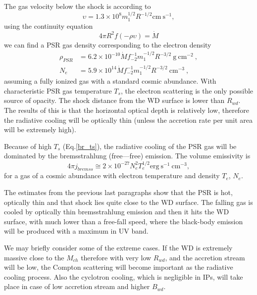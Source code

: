 \documentclass[oneside,a4paper,11pt]{report}
\begin{document}
The gas velocity below the shock is according to \cite{accpower:1} 
\begin{equation}
\upsilon = 1.3 \times 10^8 m_1^{1/2}R^{-1/2} \mathrm{cm \: s^{-1}}, 
\end{equation}
using the continuity equation 
\begin{equation}
 4\pi R^2 f(- \rho \upsilon) = \dot{M}
\end{equation}
we can find a PSR gas density corresponding to the electron density
\begin{equation}
 \label{gas_el_den_PSR}
\begin{split}
\rho_{PSR} &= 6.2 \times 10^{-10} \dot{M}f_{-2}^{-1}m_1^{-1/2}R^{-3/2} \: \mathrm{g \: cm^{-2}} \:, \\
N_e &= 5.9 \times 10^{14} \dot{M} f_{-2}^{-1}m_1^{-1/2}R^{-3/2} \: \mathrm{cm^{-3}} \:, 
\end{split}
\end{equation}
assuming a fully ionized gas with a standard cosmic abundance. 
With characteristic PSR gas temperature $T_s$, the electron scattering is the only possible source of opacity. 
The shock distance from the WD surface is lower than $R_{wd}$. The results of this is that the horizontal optical 
depth is relatively low, therefore the radiative cooling will be optically thin (unless the accretion 
rate per unit area will be extremely high).   
  
Because of high $T_s$ (Eq.\eqref{br_ts}), the radiative cooling of the PSR gas will be dominated by the 
bremsstrahlung (free—free) emission. The volume emissivity is
\begin{equation}
4\pi j_{bremss} \cong 2 \times 10^{-27} N_e^2 T_e^{1/2} \mathrm{erg \:s^{-1} \: cm^{-3}}, 
\end{equation}
for a gas of a cosmic abundance with electron temperature and density $T_e$, $N_e$.  

The estimates from the previous last paragraphs show that the PSR is hot, optically thin and that shock lies quite 
close to the WD surface. The falling gas is cooled by optically thin bremsstrahlung emission and then 
it hits the WD surface, with much lower than a free-fall speed, where the black-body emission will be produced
with a maximum in UV band.   

We may briefly consider some of the extreme cases. If the WD is extremely massive close to the $M_{ch}$ 
therefore with very low $R_{wd}$, and the accretion stream will be low, the Compton scattering will 
become important as the radiative cooling process. Also the cyclotron cooling, which is negligible in 
IPs, will take place in case of low accretion stream and higher $B_{wd}$.   
\end{document}
